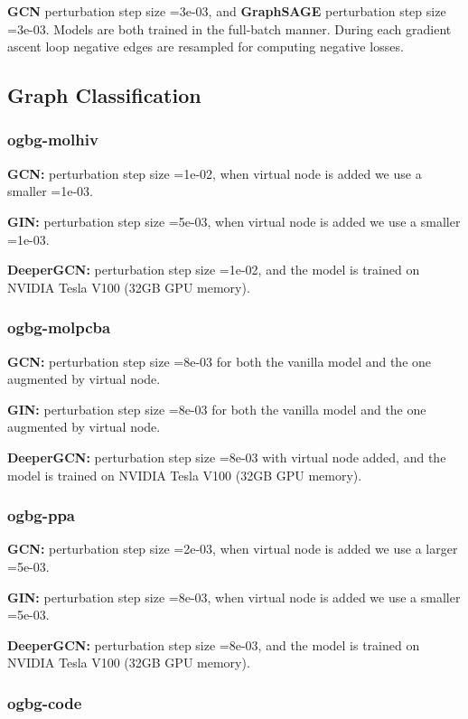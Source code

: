 \documentclass[11pt]{article}
\begin{document}
\textbf{GCN} perturbation step size =3e-03, and \textbf{GraphSAGE} perturbation step size =3e-03. Models are both trained in the full-batch manner. During each gradient ascent loop negative edges are resampled for computing negative losses. 

\subsection{Graph Classification}

\subsubsection{ogbg-molhiv}

\textbf{GCN:} perturbation step size =1e-02, when virtual node is added we use a smaller =1e-03.

\textbf{GIN:} perturbation step size =5e-03, when virtual node is added we use a smaller =1e-03.

\textbf{DeeperGCN:} perturbation step size =1e-02, and the model is trained on NVIDIA Tesla V100 (32GB GPU memory).

\subsubsection{ogbg-molpcba}

\textbf{GCN:} perturbation step size =8e-03 for both the vanilla model and the one augmented by virtual node.

\textbf{GIN:} perturbation step size =8e-03 for both the vanilla model and the one augmented by virtual node.

\textbf{DeeperGCN:} perturbation step size =8e-03 with virtual node added, and the model is trained on NVIDIA Tesla V100 (32GB GPU memory).

\subsubsection{ogbg-ppa}

\textbf{GCN:} perturbation step size =2e-03, when virtual node is added we use a larger =5e-03.

\textbf{GIN:} perturbation step size =8e-03, when virtual node is added we use a smaller =5e-03.

\textbf{DeeperGCN:} perturbation step size =8e-03, and the model is trained on NVIDIA Tesla V100 (32GB GPU memory).

\subsubsection{ogbg-code}
\end{document}
